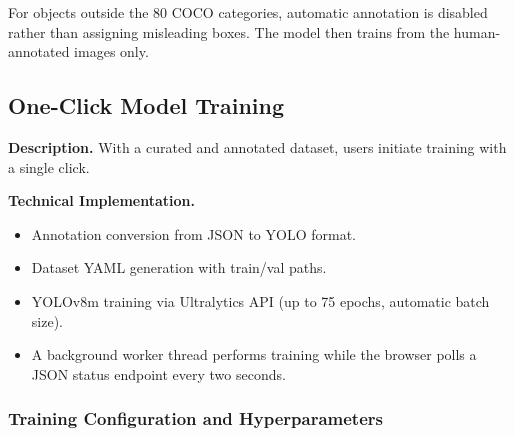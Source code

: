 \documentclass[12pt, letterpaper]{article}
\begin{document}
For objects outside the 80 COCO categories, automatic annotation is disabled rather than
assigning misleading boxes. The model then trains from the human-annotated images only.

\subsection{One-Click Model Training}

\textbf{Description.} With a curated and annotated dataset, users initiate training with a
single click.

\textbf{Technical Implementation.}
\begin{itemize}
  \item Annotation conversion from JSON to YOLO format.
  \item Dataset YAML generation with train/val paths.
  \item YOLOv8m training via Ultralytics API (up to 75 epochs, automatic batch size).
  \item A background worker thread performs training while the browser polls a JSON
    status endpoint every two seconds.
\end{itemize}

\subsubsection{Training Configuration and Hyperparameters}
\end{document}
